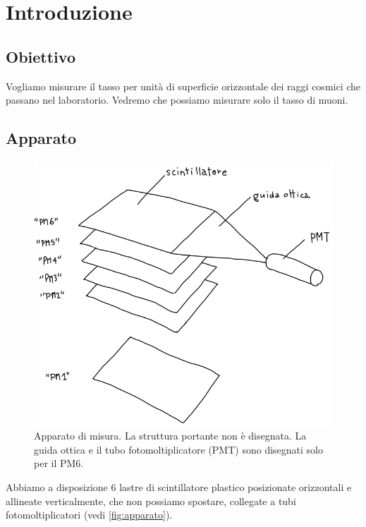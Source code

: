 \section{Introduzione}

\subsection{Obiettivo}

Vogliamo misurare il tasso per unità di superficie orizzontale
dei raggi cosmici che passano nel laboratorio.
Vedremo che possiamo misurare solo il tasso di muoni.

\subsection{Apparato}

\begin{figure}
	\center
	\includegraphics[width=\textwidth]{apparato}
	\caption{\label{fig:apparato}
	Apparato di misura.
	La struttura portante non è disegnata.
	La guida ottica e il tubo fotomoltiplicatore (PMT) sono disegnati solo per il PM6.}
\end{figure}

Abbiamo a disposizione 6 lastre di scintillatore plastico
posizionate orizzontali e allineate verticalmente,
che non possiamo spostare,
collegate a tubi fotomoltiplicatori (vedi \autoref{fig:apparato}).
